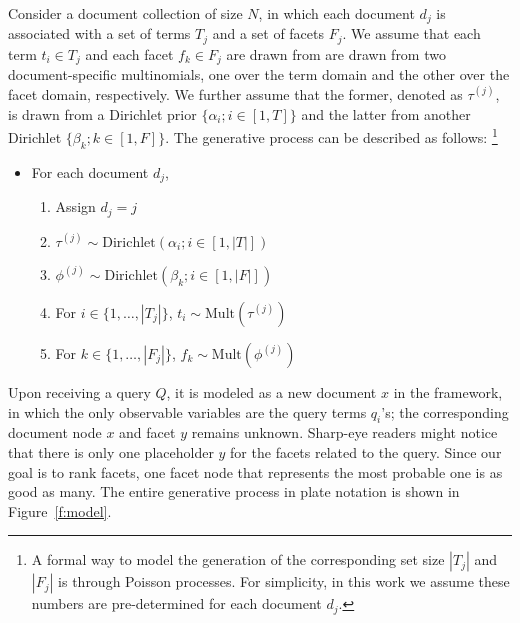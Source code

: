 Consider a document collection of size $N$, in which each document $d_j$ is
associated with a set of terms $T_j$ and a set of facets $F_j$.  We assume that
each term $t_i \in T_j$ and each facet $f_k \in F_j$ are drawn from are drawn
from two document-specific multinomials, one over the term domain and the other
over the facet domain, respectively.  We further assume that the former,
denoted as $\tau^{(j)}$, is drawn from a Dirichlet prior $\{ \alpha_i; i \in
[1, T] \}$ and the latter from another Dirichlet $\{ \beta_k; k \in [1, F] \}$.
The generative process can be described as follows: \footnote{A formal way to
model the generation of the corresponding set size $|T_j|$ and $|F_j|$ is
through Poisson processes.  For simplicity, in this work we assume these
numbers are pre-determined for each document $d_j$.} 

\begin{itemize} 
  \item For each document $d_j$, \begin{enumerate}
    \item Assign $d_j = j$
    \item $\tau^{(j)} \sim \textrm{Dirichlet}(\alpha_i; i \in [1, |T|])$
    \item $\phi^{(j)} \sim \textrm{Dirichlet}(\beta_k; i \in [1, |F|])$
    \item For $i \in \{ 1, \ldots, |T_j| \}$, $t_i \sim \textrm{Mult}(\tau^{(j)})$ 
    \item For $k \in \{ 1, \ldots, |F_j| \}$, $f_k \sim \textrm{Mult}(\phi^{(j)})$ 
  \end{enumerate}
\end{itemize}

Upon receiving a query $Q$, it is modeled as a new document $x$ in the
framework, in which the only observable variables are the query terms $q_i$'s;
the corresponding document node $x$ and facet $y$ remains unknown.  Sharp-eye
readers might notice that there is only one placeholder $y$ for the facets
related to the query.  Since our goal is to rank facets, one facet node that
represents the most probable one is as good as many.  The entire generative
process in plate notation is shown in Figure~\ref{f:model}.

